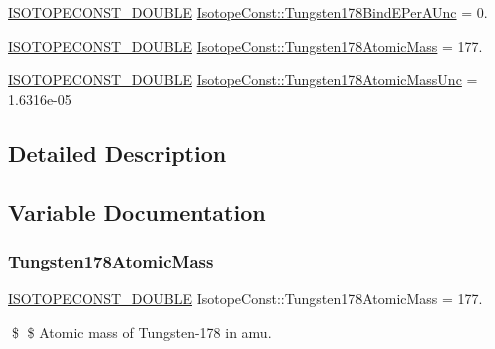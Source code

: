 \begin{DoxyCompactItemize}
\mbox{\hyperlink{group___isotope_const-_macros_ga8f45a7272ce02c0b4c65c44636ed719a}{I\+S\+O\+T\+O\+P\+E\+C\+O\+N\+S\+T\+\_\+\+D\+O\+U\+B\+LE}} \mbox{\hyperlink{group___isotope_const-_tungsten-_w178_ga11187bbb81036600c6a1a49773046e6d}{Isotope\+Const\+::\+Tungsten178\+Bind\+E\+Per\+A\+Unc}} = 0.
\item 
\mbox{\hyperlink{group___isotope_const-_macros_ga8f45a7272ce02c0b4c65c44636ed719a}{I\+S\+O\+T\+O\+P\+E\+C\+O\+N\+S\+T\+\_\+\+D\+O\+U\+B\+LE}} \mbox{\hyperlink{group___isotope_const-_tungsten-_w178_ga8b8e11b32586483156b8996c32916302}{Isotope\+Const\+::\+Tungsten178\+Atomic\+Mass}} = 177.
\item 
\mbox{\hyperlink{group___isotope_const-_macros_ga8f45a7272ce02c0b4c65c44636ed719a}{I\+S\+O\+T\+O\+P\+E\+C\+O\+N\+S\+T\+\_\+\+D\+O\+U\+B\+LE}} \mbox{\hyperlink{group___isotope_const-_tungsten-_w178_ga31bb647a05b5f136804668d473a665a2}{Isotope\+Const\+::\+Tungsten178\+Atomic\+Mass\+Unc}} = 1.\+6316e-\/05
\end{DoxyCompactItemize}


\subsection{Detailed Description}


\subsection{Variable Documentation}
\mbox{\label{group___isotope_const-_tungsten-_w178_ga8b8e11b32586483156b8996c32916302}} 
\subsubsection{\texorpdfstring{Tungsten178\+Atomic\+Mass}{Tungsten178AtomicMass}}
{\footnotesize\ttfamily \mbox{\hyperlink{group___isotope_const-_macros_ga8f45a7272ce02c0b4c65c44636ed719a}{I\+S\+O\+T\+O\+P\+E\+C\+O\+N\+S\+T\+\_\+\+D\+O\+U\+B\+LE}} Isotope\+Const\+::\+Tungsten178\+Atomic\+Mass = 177.}

\$ \$ Atomic mass of Tungsten-\/178 in amu. \mbox{\label{group___isotope_const-_tungsten-_w178_ga31bb647a05b5f136804668d473a665a2}} 

